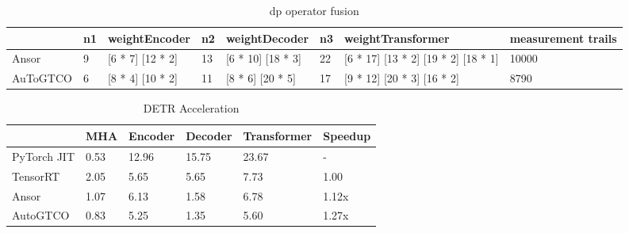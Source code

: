 \begin{table}[htbp]
\caption{dp operator fusion}
\centering
\begin{tabular}{|l|l|l|l|l|l|l|l|}
\hline
         & n1 & weightEncoder                  & n2 & weightDecoder                   & n3 & weightTransformer                                         & measurement trails \\ \hline
Ansor    & 9  & {[}6 * 7{]} {[}12 * 2{]} & 13 & {[}6 * 10{]} {[}18 * 3{]} & 22 & {[}6 * 17{]} {[}13 * 2{]} {[}19 * 2{]} {[}18 * 1{]}  & 10000\\ \hline
AuToGTCO & 6   & {[}8 * 4{]} {[}10 * 2{]} & 11   &  {[}8 * 6{]} {[}20 * 5{]}  &  17  & {[}9 * 12{]} {[}20 * 3{]} {[}16 * 2{]}         & 8790            \\ \hline
\end{tabular}
\end{table}


\begin{table}[htbp]
    \caption{DETR Acceleration}
    \centering
    \begin{tabular}{|l|l|l|l|l|l|}
    \hline
                & MHA  & Encoder & Decoder & Transformer & Speedup \\ \hline
    PyTorch JIT & 0.53 & 12.96   & 15.75   & 23.67       & -   \\ \hline
    TensorRT    & 2.05 & 5.65    & 5.65    & 7.73        & 1.00    \\ \hline
    Ansor       & 1.07 & 6.13    & 1.58    & 6.78        & 1.12x   \\ \hline
    AutoGTCO    & 0.83 & 5.25    & 1.35    & 5.60        & 1.27x   \\ \hline
    \end{tabular}
\end{table}


\begin{table}[htbp]
    \caption{image recognition with transformers acceleration}
    \centering
\end{table}